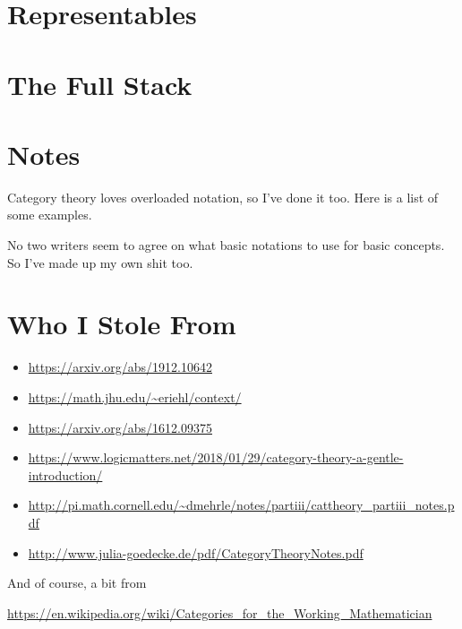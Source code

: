 \section{Representables}

\section{The Full Stack}

\section{Notes}

Category theory loves overloaded notation, so I've done it too. Here is a list of some
examples.

No two writers seem to agree on what basic notations to use for basic concepts. So I've
made up my own shit too.

\section{Who I Stole From}

\small
\begin{itemize}
\item \url{https://arxiv.org/abs/1912.10642}

\item \url{https://math.jhu.edu/~eriehl/context/}

\item \url{https://arxiv.org/abs/1612.09375}

\item \url{https://www.logicmatters.net/2018/01/29/category-theory-a-gentle-introduction/}

\item \url{http://pi.math.cornell.edu/~dmehrle/notes/partiii/cattheory_partiii_notes.pdf}

\item \url{http://www.julia-goedecke.de/pdf/CategoryTheoryNotes.pdf}

\end{itemize}

And of course, a bit from

\url{https://en.wikipedia.org/wiki/Categories_for_the_Working_Mathematician}